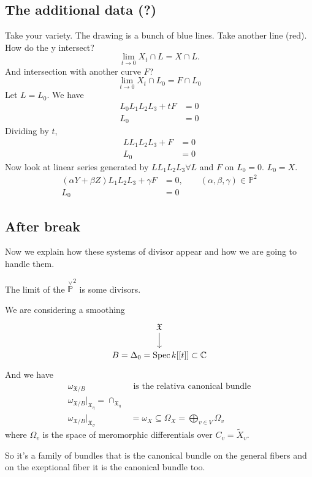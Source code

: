 \subsection{The additional data (?)}

Take your variety. The drawing is a bunch of blue lines. Take another line (red). How do the y intersect?
\[\lim_{t\to 0}X_t\cap L=X\cap L.\]
And intersection with another curve $F$?
\[\lim_{t \to 0} X_t\cap L_0=F\cap L_0\]
Let $L=L_0$. We have
\begin{align*}
	L_0L_1L_2L_3+tF&=0\\
	L_0&=0
\end{align*}
Dividing by $t$,
\begin{align*}
	LL_1L_2L_3+F&=0\\
	L_0&=0
\end{align*}
Now look at linear series generated by $LL_1L_2L_3\forall L$ and $F$ on $L_0=0$. $L_0=X$.
\begin{align*}
	(\alpha Y+\beta Z)L_1L_2L_3+\gamma F&=0,\qquad (\alpha,\beta,\gamma )\in\mathbb{P}^2\\
	L_0&=0
\end{align*}

\subsection{After break}

Now we explain how these systems of divisor appear and how we are going to handle them.

The limit of the $\overset{\vee }{\mathbb{P}}^2$ is some divisors.

We are considering a smoothing
\[\begin{tikzcd}
	\mathfrak{X}\arrow[d]\\
B= \Delta_0= \operatorname{Spec}k[[t]]\subset \mathbb{C}
\end{tikzcd}\]
And we have
\begin{align*}
	\omega_{\mathfrak{X} /B}&\text{ is the relativa canonical bundle}\\
	\omega_{\mathfrak{X} /B}\Big|_{\mathfrak{X}_\eta}=\cap_{\mathfrak{X}_\eta}\\
	\omega_{\mathfrak{X} /B}\Big|_{\mathfrak{X}_\sigma}&=\omega_{X}\subseteq \Omega_X=\bigoplus_{v\in V}\Omega_v  
\end{align*}
where $\Omega_v$ is the space of meromorphic differentials over $C_v=\tilde{X}_v$.

So it's a family of bundles that is the canonical bundle on the general fibers and on the exeptional fiber it is the canonical bundle too.

